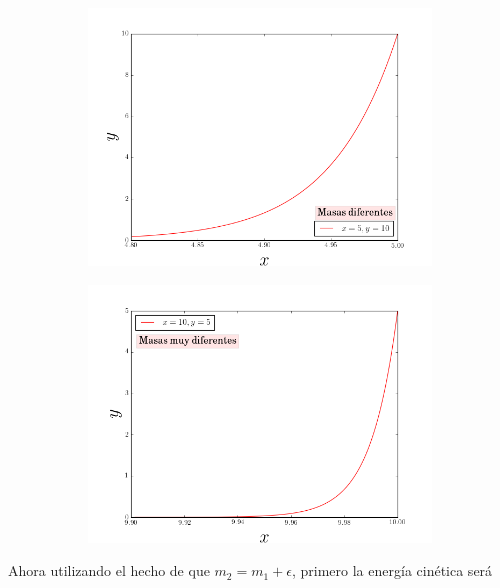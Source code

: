 \documentclass[a4paper,10pt]{article}
\numberwithin{equation}{section}
\begin{document}
\begin{multicols}{2}
\begin{figure}[H]
\begin{subfigure}{.4\textwidth}
\centering
\includegraphics[scale=0.3]{problema1fig4}
\label{fig:problema1fig4}
\end{subfigure}

\begin{subfigure}{.4\textwidth}
\centering
\includegraphics[scale=0.3]{problema1fig5}
\label{fig:problema1fig5}
\end{subfigure}
\end{figure}
\end{multicols}

Ahora utilizando el hecho de que $m_2 = m_1 + \epsilon$, primero la energía cinética será
\end{document}
